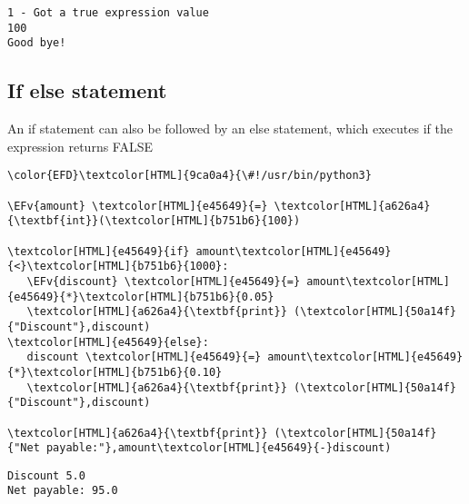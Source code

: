 \documentclass{scrartcl}
\newcommand{\EFv}[1]{\textcolor{EFv}{#1}} %
\begin{document}
\begin{verbatim}
1 - Got a true expression value
100
Good bye!
\end{verbatim}

\subsection{If else statement}
\label{sec:org45e47ca}
An if statement can also be followed by an else statement, which executes if the
expression returns FALSE
\begin{Code}
\begin{Verbatim}[]
\color{EFD}\textcolor[HTML]{9ca0a4}{\#!/usr/bin/python3}

\EFv{amount} \textcolor[HTML]{e45649}{=} \textcolor[HTML]{a626a4}{\textbf{int}}(\textcolor[HTML]{b751b6}{100})

\textcolor[HTML]{e45649}{if} amount\textcolor[HTML]{e45649}{<}\textcolor[HTML]{b751b6}{1000}:
   \EFv{discount} \textcolor[HTML]{e45649}{=} amount\textcolor[HTML]{e45649}{*}\textcolor[HTML]{b751b6}{0.05}
   \textcolor[HTML]{a626a4}{\textbf{print}} (\textcolor[HTML]{50a14f}{"Discount"},discount)
\textcolor[HTML]{e45649}{else}:
   discount \textcolor[HTML]{e45649}{=} amount\textcolor[HTML]{e45649}{*}\textcolor[HTML]{b751b6}{0.10}
   \textcolor[HTML]{a626a4}{\textbf{print}} (\textcolor[HTML]{50a14f}{"Discount"},discount)

\textcolor[HTML]{a626a4}{\textbf{print}} (\textcolor[HTML]{50a14f}{"Net payable:"},amount\textcolor[HTML]{e45649}{-}discount)
\end{Verbatim}
\end{Code}

\begin{verbatim}
Discount 5.0
Net payable: 95.0
\end{verbatim}
\end{document}
